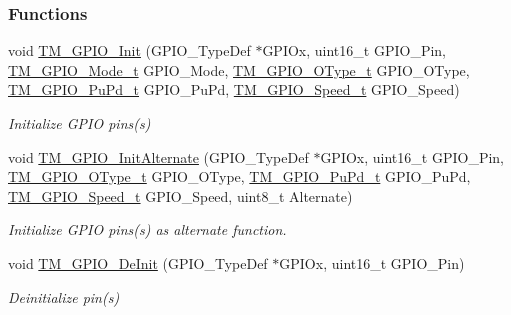 \subsubsection*{Functions}
\begin{DoxyCompactItemize}
\item 
void \hyperlink{group___t_m___g_p_i_o___functions_ga7ea61719f45c8d46e56f636d7ffdf0d0}{T\+M\+\_\+\+G\+P\+I\+O\+\_\+\+Init} (G\+P\+I\+O\+\_\+\+Type\+Def $\ast$G\+P\+I\+Ox, uint16\+\_\+t G\+P\+I\+O\+\_\+\+Pin, \hyperlink{group___t_m___g_p_i_o___typedefs_gacbb363a57d0e70ea563e494eff1db3ca}{T\+M\+\_\+\+G\+P\+I\+O\+\_\+\+Mode\+\_\+t} G\+P\+I\+O\+\_\+\+Mode, \hyperlink{group___t_m___g_p_i_o___typedefs_ga1d443fe266a4073f40ea271ae7b8df9f}{T\+M\+\_\+\+G\+P\+I\+O\+\_\+\+O\+Type\+\_\+t} G\+P\+I\+O\+\_\+\+O\+Type, \hyperlink{group___t_m___g_p_i_o___typedefs_ga50ddb0da56d8a388dee368c55e968602}{T\+M\+\_\+\+G\+P\+I\+O\+\_\+\+Pu\+Pd\+\_\+t} G\+P\+I\+O\+\_\+\+Pu\+Pd, \hyperlink{group___t_m___g_p_i_o___typedefs_gaa57736d106efbe14067be22025f296c4}{T\+M\+\_\+\+G\+P\+I\+O\+\_\+\+Speed\+\_\+t} G\+P\+I\+O\+\_\+\+Speed)
\begin{DoxyCompactList}\small\item\em Initialize G\+P\+I\+O pins(s) \end{DoxyCompactList}\item 
void \hyperlink{group___t_m___g_p_i_o___functions_gac91349d1bf42b50463ebc2716130eb89}{T\+M\+\_\+\+G\+P\+I\+O\+\_\+\+Init\+Alternate} (G\+P\+I\+O\+\_\+\+Type\+Def $\ast$G\+P\+I\+Ox, uint16\+\_\+t G\+P\+I\+O\+\_\+\+Pin, \hyperlink{group___t_m___g_p_i_o___typedefs_ga1d443fe266a4073f40ea271ae7b8df9f}{T\+M\+\_\+\+G\+P\+I\+O\+\_\+\+O\+Type\+\_\+t} G\+P\+I\+O\+\_\+\+O\+Type, \hyperlink{group___t_m___g_p_i_o___typedefs_ga50ddb0da56d8a388dee368c55e968602}{T\+M\+\_\+\+G\+P\+I\+O\+\_\+\+Pu\+Pd\+\_\+t} G\+P\+I\+O\+\_\+\+Pu\+Pd, \hyperlink{group___t_m___g_p_i_o___typedefs_gaa57736d106efbe14067be22025f296c4}{T\+M\+\_\+\+G\+P\+I\+O\+\_\+\+Speed\+\_\+t} G\+P\+I\+O\+\_\+\+Speed, uint8\+\_\+t Alternate)
\begin{DoxyCompactList}\small\item\em Initialize G\+P\+I\+O pins(s) as alternate function. \end{DoxyCompactList}\item 
void \hyperlink{group___t_m___g_p_i_o___functions_gac87f1d18ac3e984bce0cbf44f7210198}{T\+M\+\_\+\+G\+P\+I\+O\+\_\+\+De\+Init} (G\+P\+I\+O\+\_\+\+Type\+Def $\ast$G\+P\+I\+Ox, uint16\+\_\+t G\+P\+I\+O\+\_\+\+Pin)
\begin{DoxyCompactList}\small\item\em Deinitialize pin(s) \end{DoxyCompactList}\item 

\end{DoxyCompactItemize}
